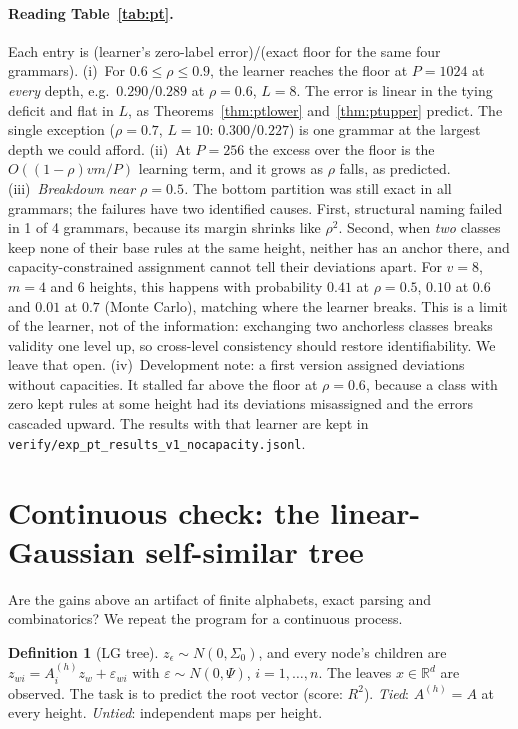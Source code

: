 \documentclass[11pt]{article}
\theoremstyle{definition}
\newtheorem{definition}[theorem]{Definition}
\newcommand{\R}{\mathbb R}
\begin{document}
\paragraph{Reading Table~\ref{tab:pt}.} Each entry is (learner's zero-label error)/(exact
floor for the same four grammars).
(i)~For $0.6\le\rho\le0.9$, the learner reaches the floor at $P=1024$ at \emph{every} depth,
e.g.\ $0.290/0.289$ at $\rho=0.6$, $L=8$. The error is linear in the tying deficit and flat in $L$, as
Theorems~\ref{thm:ptlower} and~\ref{thm:ptupper} predict. The single exception
($\rho=0.7$, $L=10$: $0.300/0.227$) is one grammar at the largest depth we could afford.
(ii)~At $P=256$ the excess over the floor is the $O((1-\rho)vm/P)$ learning term, and it grows
as $\rho$ falls, as predicted.
(iii)~\emph{Breakdown near $\rho=0.5$.} The bottom partition was still exact in all grammars;
the failures have two identified causes. First, structural naming failed in 1 of 4 grammars,
because its margin shrinks like $\rho^2$. Second, when \emph{two} classes keep none of their base
rules at the same height, neither has an anchor there, and capacity-constrained assignment
cannot tell their deviations apart. For $v=8$, $m=4$ and 6 heights, this happens with probability
$0.41$ at $\rho=0.5$, $0.10$ at $0.6$ and $0.01$ at $0.7$ (Monte Carlo), matching where the
learner breaks. This is a limit of the learner, not of the information: exchanging two
anchorless classes breaks validity one level up, so cross-level consistency should restore
identifiability. We leave that open.
(iv)~Development note: a first version assigned deviations without capacities. It stalled far
above the floor at $\rho=0.6$, because a class with zero kept rules at some height had its
deviations misassigned and the errors cascaded upward. The results with that learner are kept in
\texttt{verify/exp\_pt\_results\_v1\_nocapacity.jsonl}.

\section{Continuous check: the linear-Gaussian self-similar tree}\label{sec:cont}
Are the gains above an artifact of finite alphabets, exact parsing and combinatorics? We repeat
the program for a continuous process.

\begin{definition}[LG tree]
$z_\epsilon\sim N(0,\Sigma_0)$, and every node's children are $z_{wi}=A^{(h)}_iz_w+\varepsilon_{wi}$
with $\varepsilon\sim N(0,\Psi)$, $i=1,\dots,n$. The leaves $x\in\R^d$ are observed. The task is
to predict the root vector (score: $R^2$). \emph{Tied}: $A^{(h)}=A$ at every height.
\emph{Untied}: independent maps per height.
\end{definition}
\end{document}
